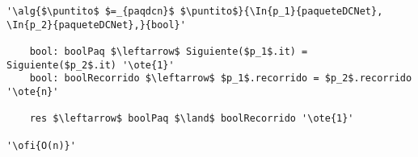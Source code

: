 \begin{lstlisting}[mathescape]
'\alg{$\puntito$ $=_{paqdcn}$ $\puntito$}{\In{p_1}{paqueteDCNet}, \In{p_2}{paqueteDCNet},}{bool}'
	
	bool: boolPaq $\leftarrow$ Siguiente($p_1$.it) = Siguiente($p_2$.it) '\ote{1}'
	bool: boolRecorrido $\leftarrow$ $p_1$.recorrido = $p_2$.recorrido '\ote{n}'

	res $\leftarrow$ boolPaq $\land$ boolRecorrido '\ote{1}'

'\ofi{O(n)}'
\end{lstlisting}
